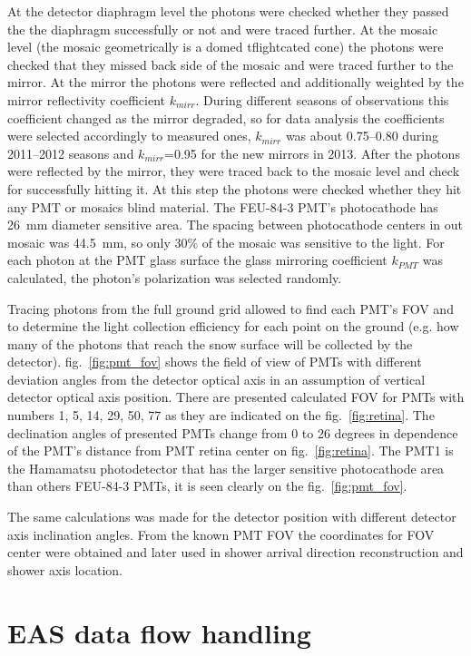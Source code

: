 \documentclass[final,5p,times,twocolumn]{elsarticle}
\begin{document}
At the detector diaphragm level the photons were checked whether they passed the the diaphragm successfully or not and were traced further. At the mosaic level (the mosaic geometrically is a domed {\color{red}tflightcated} cone) the photons were checked that they missed back side of the mosaic and were traced further to the mirror. At the mirror the photons were reflected and additionally weighted by the mirror reflectivity coefficient $k_{mirr}$. During different seasons of observations this coefficient changed as the mirror degraded, so for data analysis the coefficients were selected accordingly to {\color{red} measured ones}, $k_{mirr}$ was about 0.75--0.80 during 2011--2012 seasons and $k_{mirr}$=0.95 for the new mirrors in 2013. After the photons were reflected by the mirror, they were traced back to the mosaic level and check for successfully hitting it. At this step the photons were checked whether they hit any PMT or mosaics blind material. The \mbox{FEU-84-3} PMT's photocathode has 26~mm diameter sensitive area. The spacing between photocathode centers in out mosaic was 44.5~mm, so only 30\% of the mosaic was sensitive to the light. For each photon at the PMT glass surface the glass mirroring coefficient $k_{PMT}$ was calculated, the photon's polarization was selected randomly.

Tracing photons from the full ground grid allowed to find each PMT's FOV and to determine the light collection efficiency for each point on the ground (e.g. how many of the photons that reach the snow surface will be collected by the detector).
fig.~\ref{fig:pmt_fov} shows the field of view of PMTs with different deviation angles  from the detector optical axis in an assumption of vertical detector optical axis position. There are presented calculated FOV for PMTs with numbers 1, 5, 14, 29, 50, 77 as they are indicated on the fig.~\ref{fig:retina}. The declination angles of presented PMTs change from 0 to 26 degrees in dependence of the PMT's distance from PMT retina center on fig.~\ref{fig:retina}. The PMT1 is the Hamamatsu photodetector that has the larger sensitive photocathode area than others FEU-84-3 PMTs, it is seen clearly on the fig.~\ref{fig:pmt_fov}. 

The same calculations was made for the detector position with different detector axis inclination angles. From the known PMT FOV the coordinates for FOV center were obtained and later used in shower arrival direction reconstruction and shower axis location.

\section{EAS data flow handling}
\end{document}

